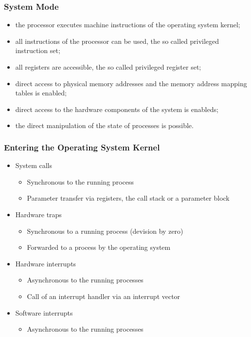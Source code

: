 \documentclass[11pt]{article}
\begin{document}
\subsubsection{System Mode}
\label{sec:org4836360}
\begin{itemize}
\item the processor executes machine instructions of the operating system kernel;
\item all instructions of the processor can be used, the so called privileged instruction set;
\item all registers are accessible, the so called privileged register set;
\item direct access to physical memory addresses and the memory address mapping tables is enabled;
\item direct access to the hardware components of the system is enableds;
\item the direct manipulation of the state of processes is possible.
\end{itemize}
\subsubsection{Entering the Operating System Kernel}
\label{sec:orga49df96}
\begin{itemize}
\item System calls
\begin{itemize}
\item Synchronous to the running process
\item Parameter transfer via registers, the call stack or a parameter block
\end{itemize}
\item Hardware traps
\begin{itemize}
\item Synchronous to a running process (devision by zero)
\item Forwarded to a process by the operating system
\end{itemize}
\item Hardware interrupts
\begin{itemize}
\item Asynchronous to the running processes
\item Call of an interrupt handler via an interrupt vector
\end{itemize}
\item Software interrupts
\begin{itemize}
\item Asynchronous to the running processes
\end{itemize}
\end{itemize}
\end{document}
